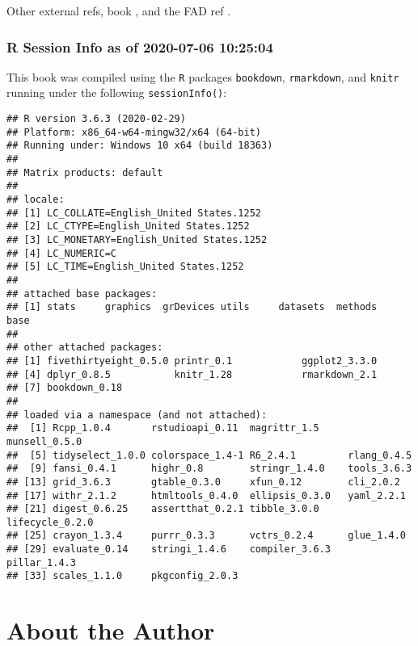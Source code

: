 \documentclass[
]{book}
\begin{document}
Other external refs, book \citep{xie2015}, and the FAD ref \citep{Miller_Epstein_Bishop_Keitner_1985}.

\hypertarget{r-session-info-as-of-2020-07-06-102504}{%
\subsection*{R Session Info as of 2020-07-06 10:25:04}\label{r-session-info-as-of-2020-07-06-102504}}

This book was compiled using the \texttt{R} packages \texttt{bookdown}, \texttt{rmarkdown}, and \texttt{knitr} running under the following \texttt{sessionInfo()}:

\begin{verbatim}
## R version 3.6.3 (2020-02-29)
## Platform: x86_64-w64-mingw32/x64 (64-bit)
## Running under: Windows 10 x64 (build 18363)
## 
## Matrix products: default
## 
## locale:
## [1] LC_COLLATE=English_United States.1252 
## [2] LC_CTYPE=English_United States.1252   
## [3] LC_MONETARY=English_United States.1252
## [4] LC_NUMERIC=C                          
## [5] LC_TIME=English_United States.1252    
## 
## attached base packages:
## [1] stats     graphics  grDevices utils     datasets  methods   base     
## 
## other attached packages:
## [1] fivethirtyeight_0.5.0 printr_0.1            ggplot2_3.3.0        
## [4] dplyr_0.8.5           knitr_1.28            rmarkdown_2.1        
## [7] bookdown_0.18        
## 
## loaded via a namespace (and not attached):
##  [1] Rcpp_1.0.4       rstudioapi_0.11  magrittr_1.5     munsell_0.5.0   
##  [5] tidyselect_1.0.0 colorspace_1.4-1 R6_2.4.1         rlang_0.4.5     
##  [9] fansi_0.4.1      highr_0.8        stringr_1.4.0    tools_3.6.3     
## [13] grid_3.6.3       gtable_0.3.0     xfun_0.12        cli_2.0.2       
## [17] withr_2.1.2      htmltools_0.4.0  ellipsis_0.3.0   yaml_2.2.1      
## [21] digest_0.6.25    assertthat_0.2.1 tibble_3.0.0     lifecycle_0.2.0 
## [25] crayon_1.3.4     purrr_0.3.3      vctrs_0.2.4      glue_1.4.0      
## [29] evaluate_0.14    stringi_1.4.6    compiler_3.6.3   pillar_1.4.3    
## [33] scales_1.1.0     pkgconfig_2.0.3
\end{verbatim}

\hypertarget{about-the-author}{%
\chapter*{About the Author}\label{about-the-author}}
\end{document}
